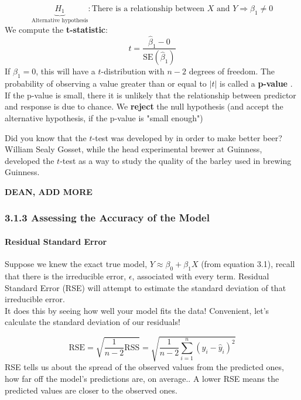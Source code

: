          \begin{equation*}\tag{3.13}
            \underbrace{H_1}_{\text{Alternative hypothesis}}: \text{There is a relationship between } X \text{ and } Y\Longrightarrow \beta_1 \neq 0
         \end{equation*}
         We compute the \textbf{t-statistic}:
         \begin{equation*}\tag{3.14}
             t = \frac{\hat \beta_1-0}{\text{SE}(\hat \beta_1)}
          \end{equation*}
          If $\beta_1 = 0$, this will have a $t$-distribution with $n-2$ degrees of freedom.  The probability of observing a value greater than or equal to $|t|$ is called a \textbf{p-value} .  If the p-value is small, there it is unlikely that the relationship between predictor and response is due to chance.
         We \textbf{reject} the null hypothesis (and accept the alternative hypothesis, if the p-value is "small enough")
         
         \begin{interesting}
             Did you know that the $t$-test was developed by in order to make better beer?  William Sealy Gosset, while the head experimental brewer at Guinness, developed the $t$-test as a way to study the quality of the barley used in brewing Guinness.
         \end{interesting}
         
         \textbf{DEAN, ADD MORE}
         
        \subsubsection*{3.1.3 Assessing the Accuracy of the Model}
        \paragraph{Residual Standard Error\\}
        Suppose we knew the exact true model, $Y\approx \beta_0+\beta_1 X$ (from equation 3.1), recall that there is the irreducible error, $\epsilon$, associated with every term.  Residual Standard Error (RSE) will attempt to estimate the standard deviation of that irreducible error.\\
        
        It does this by seeing how well your model fits the data!  Convenient, let's calculate the standard deviation of our residuals!  
        
        \begin{equation*}\tag{3.15}
            \text{RSE} = \sqrt{\frac{1}{n-2}\text{RSS}} = \sqrt{\frac{1}{n-2}\sum_{i=1}^n(y_i - \hat y_i)^2}
        \end{equation*}
        RSE tells us about the spread of the observed values from the predicted ones, how far off the model's predictions are, on average..  A lower RSE means the predicted values are closer to the observed ones.\\
        
